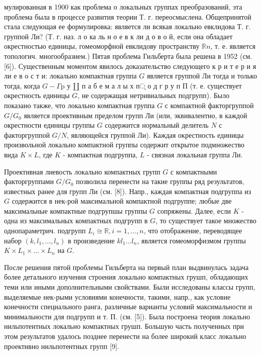 \documentclass[10pt]{article}
\begin{document}
мулированная в 1900 как проблема о локальных группах преобразований, эта проблема была в процессе развития теории Т. г. переосмыслена. Общепринятой стала следующая ее формулировка: является ли всякая локально евклидова Т. г. группой Ли? (Т. г. наз. л о ка ль н о е в к ли д о в о й, если она обладает окрестностью единицы, гомеоморфной евклидову пространству $\mathbb{R} n$, т. е. является топологич. многообразием.) Пятая проблема Гильберта была решена в 1952 (см. [6]). Существенным моментом явилось доказательство следующего к р и т е р и я ли е в о с т и: локально компактная группа $G$ является группой Ли тогда и только тогда, когда $G-\Gamma \mathrm{p}$ у $\amalg$ п а б е м а л ы х п् о д г р у п П (т. е. существует окрестность единицы $G$, не содержащая нетривиальных подгрупп). Было показано также, что локально компактная группа $G$ с компактной факторгруппой $G / G_{0}$ является проективным пределом групп Ли (или, эквивалентно, в каждой окрестности единицы группы $G$ содержится нормальный делитель $N$ с факторгруппой $G / N$, являющейся группой Ли). Каждая окрестность единицы произвольной локально компактной группы содержит открытое подмножество вида $K \times L$, где $K$ - компактная подгруппа, $L$ - связная локальная группа Ли.



Проективная лиевость локально компактных групп $G$ с компактными факторгруппами $G / G_{0}$ позволила перенести на такие группы ряд результатов, известных ранее для групп Ли (см. [8]). Напр., каждая компактная подгруппа из $G$ содержится в нек-рой максимальной компактной подгруппе; любые две максимальные компактные подгрупшы группы $G$ сопряжены. Далее, если $K$ - одна из максимальных компактных подгрупп в $G$, то существует такое множество однопараметрич. подгрупп $L_{i} \cong \mathbb{R}, i=1, \ldots, n$, что отображение, переводящее набор $\left(k, l_{1}, \ldots, l_{n}\right)$ в произведение $k l_{1} \ldots l_{n}$, является гомеоморфизмом группы $K \times L_{1} \times \ldots \times L_{n}$ на $G$.



После решения пятой проблемы Гильберта на первый план выдвинулась задача более детального изучения строения локально компактных грушп, обладающих теми или иными дополнительными свойствами. Были исследованы классы групп, выделяемые нек-рыми условиями конечности, такими, напр., как условие конечности специального ранга, различные варианты условий максимальности и минимальности для подгрупп и т. П. (см. [5]). Была построена теория локально нильпотентных локально компактных грушп. Большую часть полученных при этом результатов удалось позднее перенести на более широкий класс локально проективно нильпотентных групп [9].
\end{document}
